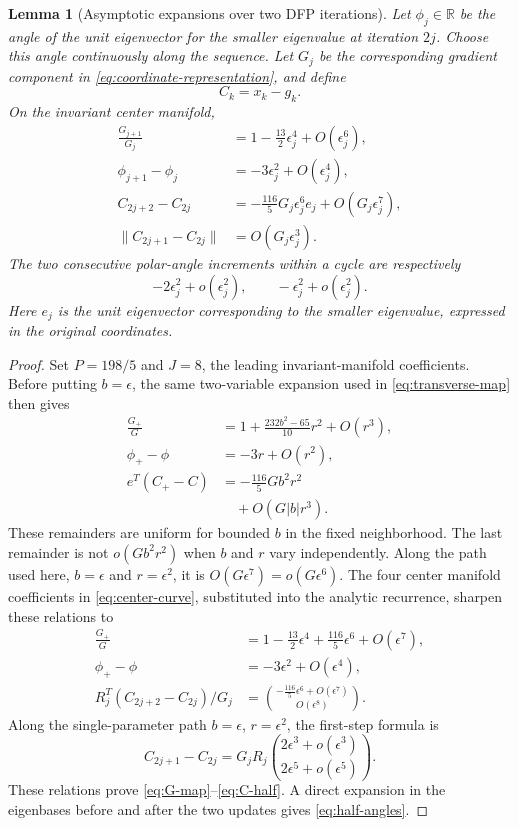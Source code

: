 \documentclass[11pt]{article}
\newtheorem{lemma}[theorem]{Lemma}
\newcommand{\R}{\mathbb R}
\begin{document}
\begin{lemma}[Asymptotic expansions over two DFP iterations]\label{lem:two-step-expansions}
Let $\phi_j\in\R$ be the angle of the unit eigenvector for the smaller
eigenvalue at iteration $2j$.  Choose this angle continuously along the
sequence.  Let $G_j$ be the corresponding gradient component in
\eqref{eq:coordinate-representation}, and define
\[
C_k=x_k-g_k.
\]
On the invariant center manifold,
\begin{align}
\frac{G_{j+1}}{G_j}
&=1-\frac{13}{2}\epsilon_j^4+O(\epsilon_j^6),
\label{eq:G-map}\\
\phi_{j+1}-\phi_j
&=-3\epsilon_j^2+O(\epsilon_j^4),
\label{eq:phi-map}\\
C_{2j+2}-C_{2j}
&=-\frac{116}{5}G_j\epsilon_j^6e_j
+O(G_j\epsilon_j^7),
\label{eq:C-map}\\
\|C_{2j+1}-C_{2j}\|&=O(G_j\epsilon_j^3).
\label{eq:C-half}
\end{align}
The two consecutive polar-angle increments within a cycle are respectively
\begin{equation}\label{eq:half-angles}
-2\epsilon_j^2+o(\epsilon_j^2),
\qquad -\epsilon_j^2+o(\epsilon_j^2).
\end{equation}
Here $e_j$ is the unit eigenvector corresponding to the smaller eigenvalue,
expressed in the original coordinates.
\end{lemma}

\begin{proof}
Set $P=198/5$ and $J=8$, the leading invariant-manifold coefficients.  Before
putting $b=\epsilon$, the same two-variable expansion used in
\eqref{eq:transverse-map} then gives
\begin{align*}
\frac{G_+}{G}
&=1+\frac{232b^2-65}{10}r^2+O(r^3),\\
\phi_+-\phi&=-3r+O(r^2),\\
e^T(C_+-C)&=-\frac{116}{5}Gb^2r^2\\
&\quad+O(G|b|r^3).
\end{align*}
These remainders are uniform for bounded $b$ in the fixed neighborhood.  The
last remainder is not $o(Gb^2r^2)$ when $b$ and $r$ vary independently.
Along the path used here,
$b=\epsilon$ and $r=\epsilon^2$, it is
$O(G\epsilon^7)=o(G\epsilon^6)$.
The four center manifold coefficients in \eqref{eq:center-curve}, substituted
into the analytic recurrence, sharpen these relations to
\begin{align*}
\frac{G_+}{G}
&=1-\frac{13}{2}\epsilon^4
+\frac{116}{5}\epsilon^6+O(\epsilon^7),\\
\phi_+-\phi&=-3\epsilon^2+O(\epsilon^4),\\
R_j^T(C_{2j+2}-C_{2j})/G_j
&=\binom{-\frac{116}{5}\epsilon^6+O(\epsilon^7)}
{O(\epsilon^8)}.
\end{align*}
Along the single-parameter path $b=\epsilon$, $r=\epsilon^2$, the first-step
formula is
\[
C_{2j+1}-C_{2j}
=G_jR_j\binom{2\epsilon^3+o(\epsilon^3)}
{2\epsilon^5+o(\epsilon^5)}.
\]
These relations prove \eqref{eq:G-map}--\eqref{eq:C-half}.  A direct expansion
in the eigenbases before and after the two updates gives
\eqref{eq:half-angles}.
\end{proof}
\end{document}
